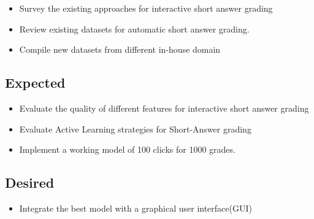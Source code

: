 \documentclass[rnd]{mas_proposal}
\begin{document}
\begin{itemize}
    \item Survey the existing approaches for interactive short answer grading
    \item Review existing datasets for automatic short answer grading.
    \item Compile new datasets from different in-house domain
\end{itemize}

\subsection{Expected}
\begin{itemize}
    \item Evaluate the quality of different features for interactive short answer grading
    \item Evaluate Active Learning strategies for Short-Answer grading
    \item Implement a working model of 100 clicks for 1000 grades.
\end{itemize}

\subsection{Desired}
\begin{itemize}
    \item Integrate the best model with a graphical user interface(GUI)
\end{itemize}


\nocite{*}

\end{document}
